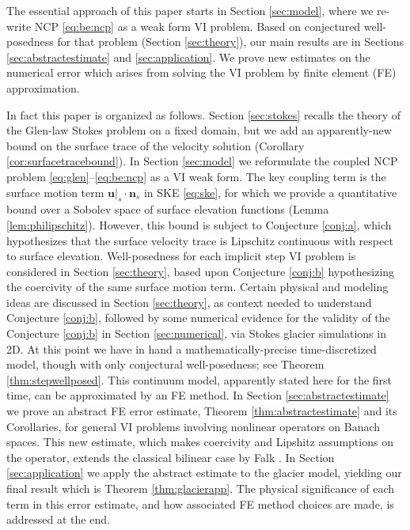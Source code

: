 \documentclass[hidelinks,onefignum,onetabnum,final]{siamart220329}  %
\newcommand{\bn}{\mathbf{n}}
\newcommand{\bu}{\mathbf{u}}
\begin{document}
The essential approach of this paper starts in Section \ref{sec:model}, where we re-write NCP \eqref{eq:be:ncp} as a weak form VI problem.  Based on conjectured well-posedness for that problem (Section \ref{sec:theory}), our main results are in Sections \ref{sec:abstractestimate} and \ref{sec:application}.  We prove new estimates on the numerical error which arises from solving the VI problem by finite element (FE) approximation.

In fact this paper is organized as follows.  Section \ref{sec:stokes} recalls the theory of the Glen-law Stokes problem on a fixed domain, but we add an apparently-new bound on the surface trace of the velocity solution (Corollary \ref{cor:surfacetracebound}).  In Section \ref{sec:model} we reformulate the coupled NCP problem \eqref{eq:glen}--\eqref{eq:be:ncp} as a VI weak form.  The key coupling term is the surface motion term $\bu|_s\cdot \bn_s$ in SKE \eqref{eq:ske}, for which we provide a quantitative bound over a Sobolev space of surface elevation functions (Lemma \ref{lem:philipschitz}).  However, this bound is subject to Conjecture \ref{conj:a}, which hypothesizes that the surface velocity trace is Lipschitz continuous with respect to surface elevation.  Well-posedness for each implicit step VI problem is considered in Section \ref{sec:theory}, based upon Conjecture \ref{conj:b} hypothesizing the coercivity of the same surface motion term.  Certain physical and modeling ideas are discussed in Section \ref{sec:theory}, as context needed to understand Conjecture \ref{conj:b}, followed by some numerical evidence for the validity of the Conjecture \ref{conj:b} in Section \ref{sec:numerical}, via Stokes glacier simulations in 2D.  At this point we have in hand a mathematically-precise time-discretized model, though with only conjectural well-posedness; see Theorem \ref{thm:stepwellposed}.  This continuum model, apparently stated here for the first time, can be approximated by an FE method.  In Section \ref{sec:abstractestimate} we prove an abstract FE error estimate, Theorem \ref{thm:abstractestimate} and its Corollaries, for general VI problems involving nonlinear operators on Banach spaces.  This new estimate, which makes coercivity and Lipshitz assumptions on the operator, extends the classical bilinear case by Falk \cite{Falk1974}.  In Section \ref{sec:application} we apply the abstract estimate to the glacier model, yielding our final result which is Theorem \ref{thm:glacierapp}.  The physical significance of each term in this error estimate, and how associated FE method choices are made, is addressed at the end.
\end{document}
